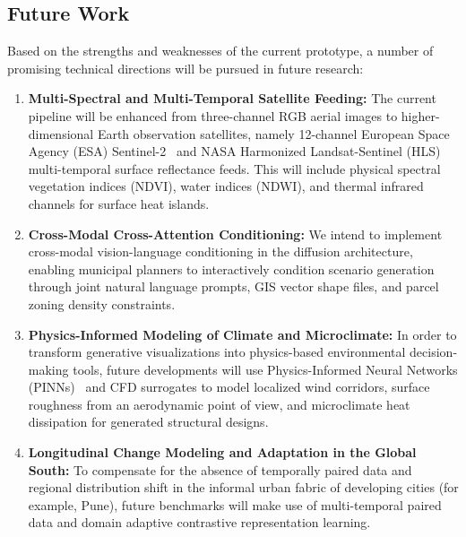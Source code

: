 \documentclass[conference]{IEEEtran}
\begin{document}
\subsection{Future Work}
Based on the strengths and weaknesses of the current prototype, a number of promising technical directions will be pursued in future research:
\begin{enumerate}
    \item \textbf{Multi-Spectral and Multi-Temporal Satellite Feeding:} The current pipeline will be enhanced from three-channel RGB aerial images to higher-dimensional Earth observation satellites, namely 12-channel European Space Agency (ESA) Sentinel-2~\cite{drusch2012sentinel} and NASA Harmonized Landsat-Sentinel (HLS) multi-temporal surface reflectance feeds. This will include physical spectral vegetation indices (NDVI), water indices (NDWI), and thermal infrared channels for surface heat islands.
    \item \textbf{Cross-Modal Cross-Attention Conditioning:} We intend to implement cross-modal vision-language conditioning in the diffusion architecture, enabling municipal planners to interactively condition scenario generation through joint natural language prompts, GIS vector shape files, and parcel zoning density constraints.
    \item \textbf{Physics-Informed Modeling of Climate and Microclimate:} In order to transform generative visualizations into physics-based environmental decision-making tools, future developments will use Physics-Informed Neural Networks (PINNs)~\cite{raissi2019physics} and CFD surrogates to model localized wind corridors, surface roughness from an aerodynamic point of view, and microclimate heat dissipation for generated structural designs.
    \item \textbf{Longitudinal Change Modeling and Adaptation in the Global South:} To compensate for the absence of temporally paired data and regional distribution shift in the informal urban fabric of developing cities (for example, Pune), future benchmarks will make use of multi-temporal paired data and domain adaptive contrastive representation learning.
\end{enumerate}
\end{document}
